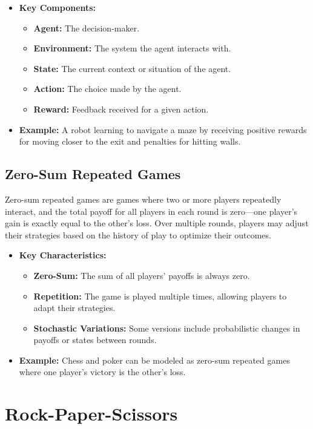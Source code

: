 \documentclass{article}
\begin{document}
\begin{itemize}
    \item \textbf{Key Components:}
    \begin{itemize}
        \item \textbf{Agent:} The decision-maker.
        \item \textbf{Environment:} The system the agent interacts with.
        \item \textbf{State:} The current context or situation of the agent.
        \item \textbf{Action:} The choice made by the agent.
        \item \textbf{Reward:} Feedback received for a given action.
    \end{itemize}
    \item \textbf{Example:} A robot learning to navigate a maze by receiving positive rewards for moving closer to the exit and penalties for hitting walls.
\end{itemize}

\subsection{Zero-Sum Repeated Games}
Zero-sum repeated games are games where two or more players repeatedly interact, and the total payoff for all players in each round is zero—one player's gain is exactly equal to the other's loss. Over multiple rounds, players may adjust their strategies based on the history of play to optimize their outcomes.

\begin{itemize}
    \item \textbf{Key Characteristics:}
    \begin{itemize}
        \item \textbf{Zero-Sum:} The sum of all players’ payoffs is always zero.
        \item \textbf{Repetition:} The game is played multiple times, allowing players to adapt their strategies.
        \item \textbf{Stochastic Variations:} Some versions include probabilistic changes in payoffs or states between rounds.
    \end{itemize}
    \item \textbf{Example:} Chess and poker can be modeled as zero-sum repeated games where one player’s victory is the other’s loss.
\end{itemize}

\section{Rock-Paper-Scissors}
\end{document}
